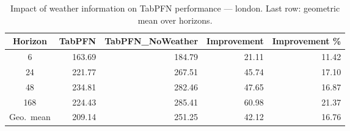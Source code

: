 \begin{table}
\centering
\caption{Impact of weather information on TabPFN performance — london. Last row: geometric mean over horizons.}
\label{tab:tabpfn_weather_london}
\begin{tabular}{crrrr}
\toprule
Horizon & TabPFN & TabPFN\_NoWeather & Improvement & Improvement \% \\
\midrule
6 & 163.69 & 184.79 & 21.11 & 11.42 \\
24 & 221.77 & 267.51 & 45.74 & 17.10 \\
48 & 234.81 & 282.46 & 47.65 & 16.87 \\
168 & 224.43 & 285.41 & 60.98 & 21.37 \\
\midrule
Geo.\ mean & 209.14 & 251.25 & 42.12 & 16.76 \\
\bottomrule
\end{tabular}
\end{table}
